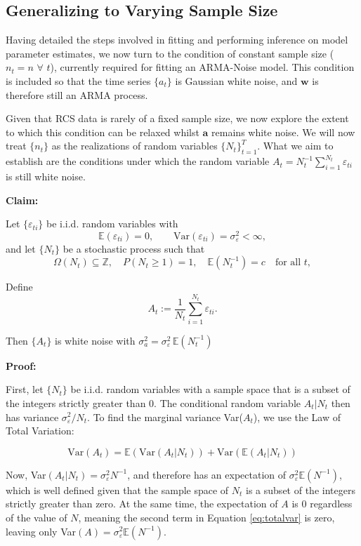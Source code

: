 
\subsection{Generalizing to Varying Sample Size}

Having detailed the steps involved in fitting and performing inference on model 
parameter estimates, we now turn to the condition of constant sample size ($n_t = n$ $\forall$ $ t$),
currently required for fitting an 
ARMA-Noise model. This condition is included so that the time series $\{a_t\}$ is Gaussian 
white noise, and $\mathbf{w}$ is therefore still an ARMA process.

Given that RCS data is rarely of a fixed sample size, we now explore the extent to which this condition can be relaxed whilst $\mathbf{a}$ remains white noise. 
We will now treat $\{n_t\}$ as the realizations of random variables $\{N_t\}_{t=1}^T$. What we aim to establish are the conditions under which the random variable
 $A_t = N_t^{-1}\sum_{i=1}^{N_t}\varepsilon_{ti}$ is still white noise.


\textbf{Claim:}


Let $\{\varepsilon_{ti}\}$ be i.i.d. random variables with
\[
\mathbb{E}(\varepsilon_{ti}) = 0, \qquad \mathrm{Var}(\varepsilon_{ti}) = \sigma_\varepsilon^2 < \infty,
\]
and let $\{N_t\}$ be a stochastic process such that
\[
\Omega(N_t) \subseteq \mathbb{Z}, \quad P(N_t \geq 1) = 1, \quad \mathbb{E}({N_t^{-1}}) = c \quad \text{for all } t,
\]

Define
\[
A_t := \frac{1}{N_t}\sum_{i=1}^{N_t} \varepsilon_{ti}.
\]

Then $\{A_t\}$ is white noise with $\sigma_a^2 = \sigma_\varepsilon^2\,\mathbb{E}(N_t^{-1})$



\textbf{Proof:}

First, let $\{N_t\}$ be i.i.d. random variables with a sample space that is a subset of the integers strictly 
greater than $0$. The conditional random variable $A_t|N_t$ then has variance $\sigma_\varepsilon^2/N_t$. To find the marginal variance Var($A_t$), we use the Law of Total Variation:

\begin{equation}
    \label{eq:totalvar}
    \text{Var}(A_t) = \mathbb{E}(\text{Var}(A_t|N_t)) + \text{Var}(\mathbb{E}(A_t|N_t))
\end{equation}

Now, Var$(A_t|N_t) = \sigma_\varepsilon^2N^{-1}$, and therefore has an expectation of
$\sigma_\varepsilon^2\mathbb{E}(N^{-1})$, which is well defined given that the sample space
of $N_t$ is a subset of the integers strictly greater than zero. At the same time, the expectation of $A$ is $0$
regardless of the value of $N$, meaning the second term in Equation \ref{eq:totalvar} is 
zero, leaving only Var$(A) = \sigma_\varepsilon^2\mathbb{E}(N^{-1})$. 


